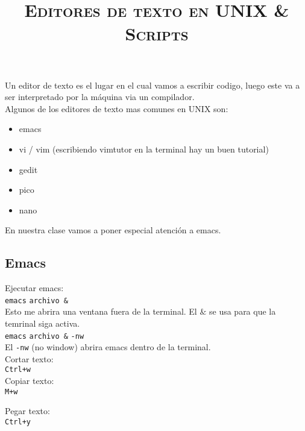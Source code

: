 \documentclass[12pt]{article}
\title{\textsc{Editores de texto en UNIX \& Scripts} }
\begin{document}
\date{}
\maketitle

Un editor de texto es el lugar en el cual vamos a escribir codigo, luego este va a ser interpretado 
por la m\'aquina via un compilador.\\

Algunos de los editores de texto mas comunes en UNIX son:

\begin{itemize}
\item emacs
\item vi / vim (escribiendo vimtutor en la terminal hay un buen tutorial)
\item gedit
\item pico 
\item nano 
\end{itemize}

En nuestra clase vamos a poner especial atenci\'on a emacs.

\begin{center}
\section*{Emacs}
\end{center}

Ejecutar emacs:\\

\texttt{emacs} \verb"archivo &"  \\

Esto me abrira una ventana fuera de la terminal. El $\&$ se usa para que la temrinal siga activa.\\

\texttt{emacs} \verb"archivo &" \texttt{-nw}  \\

El \texttt{-nw} (no window) abrira emacs dentro de la terminal.\\

Cortar texto:\\

\texttt{Ctrl+w}\\

Copiar texto:\\

\texttt{M+w}

Pegar texto:\\

\texttt{Ctrl+y}\\
\end{document}

